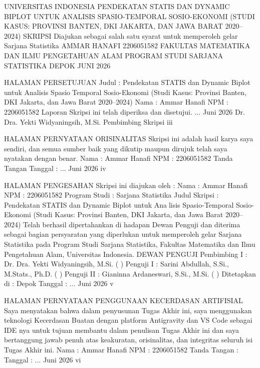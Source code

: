 UNIVERSITAS INDONESIA
PENDEKATAN STATIS DAN DYNAMIC BIPLOT UNTUK ANALISIS
SPASIO-TEMPORAL SOSIO-EKONOMI (STUDI KASUS: PROVINSI BANTEN,
DKI JAKARTA, DAN JAWA BARAT 2020–2024)
SKRIPSI
Diajukan sebagai salah satu syarat untuk memperoleh gelar
Sarjana Statistika
AMMAR HANAFI
2206051582
FAKULTAS MATEMATIKA DAN ILMU PENGETAHUAN ALAM
PROGRAM STUDI SARJANA STATISTIKA
DEPOK
JUNI 2026

HALAMAN PERSETUJUAN
Judul : Pendekatan STATIS dan Dynamic Biplot untuk Analisis SpasioTemporal Sosio-Ekonomi (Studi Kasus: Provinsi Banten, DKI
Jakarta, dan Jawa Barat 2020–2024)
Nama : Ammar Hanafi
NPM : 2206051582
Laporan Skripsi ini telah diperiksa dan disetujui.
... Juni 2026
Dr. Dra. Yekti Widyaningsih, M.Si.
Pembimbing Skripsi
iii

HALAMAN PERNYATAAN ORISINALITAS
Skripsi ini adalah hasil karya saya sendiri,
dan semua sumber baik yang dikutip maupun dirujuk
telah saya nyatakan dengan benar.
Nama : Ammar Hanafi
NPM : 2206051582
Tanda Tangan
Tanggal : ... Juni 2026
iv

HALAMAN PENGESAHAN
Skripsi ini diajukan oleh :
Nama : Ammar Hanafi
NPM : 2206051582
Program Studi : Sarjana Statistika
Judul Skripsi : Pendekatan STATIS dan Dynamic Biplot untuk Analisis Spasio-Temporal Sosio-Ekonomi (Studi Kasus:
Provinsi Banten, DKI Jakarta, dan Jawa Barat 2020–
2024)
Telah berhasil dipertahankan di hadapan Dewan Penguji dan diterima sebagai bagian
persyaratan yang diperlukan untuk memperoleh gelar Sarjana Statistika pada Program
Studi Sarjana Statistika, Fakultas Matematika dan Ilmu Pengetahuan Alam, Universitas
Indonesia.
DEWAN PENGUJI
Pembimbing I : Dr. Dra. Yekti Widyaningsih, M.Si. ( )
Penguji I : Sarini Abdullah, S.Si., M.Stats., Ph.D. ( )
Penguji II : Gianinna Ardaneswari, S.Si., M.Si. ( )
Ditetapkan di : Depok
Tanggal : ... Juni 2026
v

HALAMAN PERNYATAAN PENGGUNAAN KECERDASAN ARTIFISIAL
Saya menyatakan bahwa dalam penyusunan Tugas Akhir ini, saya menggunakan
teknologi Kecerdasan Buatan dengan platform Antigravity dan VS Code sebagai IDE
nya untuk tujuan membantu dalam penulisan Tugas Akhir ini dan saya bertanggung
jawab penuh atas keakuratan, orisinalitas, dan integritas seluruh isi Tugas Akhir ini.
Nama : Ammar Hanafi
NPM : 2206051582
Tanda Tangan :
Tanggal : ... Juni 2026
vi

